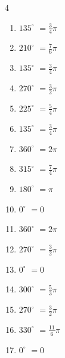 \begin{multicols}{4}
\begin{enumerate}
  \item $\displaystyle 135^{\circ}$
        $\displaystyle =\frac{3}{4}\pi$

  \item $\displaystyle 210^{\circ}$
        $\displaystyle =\frac{7}{6}\pi$

  \item $\displaystyle 135^{\circ}$
        $\displaystyle =\frac{3}{4}\pi$

  \item $\displaystyle 270^{\circ}$
        $\displaystyle =\frac{3}{2}\pi$

  \item $\displaystyle 225^{\circ}$
        $\displaystyle =\frac{5}{4}\pi$

  \item $\displaystyle 135^{\circ}$
        $\displaystyle =\frac{3}{4}\pi$

  \item $\displaystyle 360^{\circ}$
        $\displaystyle =2\pi$

  \item $\displaystyle 315^{\circ}$
        $\displaystyle =\frac{7}{4}\pi$

  \item $\displaystyle 180^{\circ}$
        $\displaystyle =\pi$

\columnbreak %

  \item $\displaystyle 0^{\circ}$
        $\displaystyle =0$

  \item $\displaystyle 360^{\circ}$
        $\displaystyle =2\pi$

  \item $\displaystyle 270^{\circ}$
        $\displaystyle =\frac{3}{2}\pi$

  \item $\displaystyle 0^{\circ}$
        $\displaystyle =0$

  \item $\displaystyle 300^{\circ}$
        $\displaystyle =\frac{5}{3}\pi$

  \item $\displaystyle 270^{\circ}$
        $\displaystyle =\frac{3}{2}\pi$

  \item $\displaystyle 330^{\circ}$
        $\displaystyle =\frac{11}{6}\pi$

  \item $\displaystyle 0^{\circ}$
        $\displaystyle =0$


\end{enumerate}
\end{multicols}
